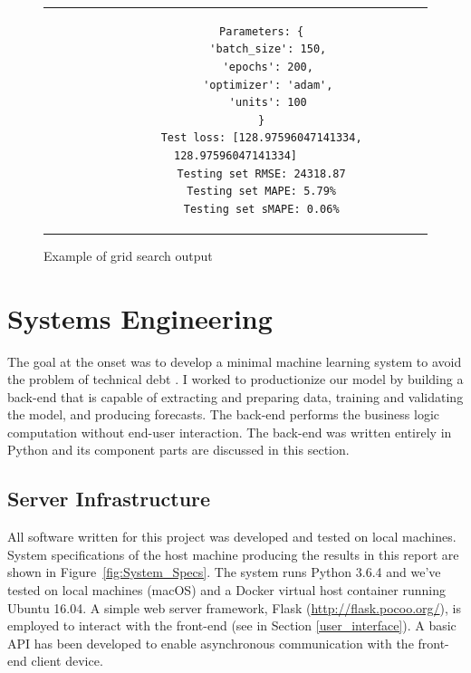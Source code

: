 \documentclass[11pt, oneside, authoryear]{report}
\begin{document}
\begin{figure}[h]
  \caption{Example of grid search output}
  \label{fig:Example_Output}
  \begin{center}
    \begin{tabular}{c}
      \begin{lstlisting}
        Parameters: {
          'batch_size': 150,
          'epochs': 200,
          'optimizer': 'adam',
          'units': 100
        }
        Test loss: [128.97596047141334, 128.97596047141334]
        Testing set RMSE: 24318.87
        Testing set MAPE: 5.79%
        Testing set sMAPE: 0.06%
      \end{lstlisting}
    \end{tabular}
  \end{center}
\end{figure}

\section{Systems Engineering}
The goal at the onset was to develop a minimal machine learning system to avoid the problem of technical debt \citep{sculley}. I worked to productionize our model by building a back-end that is capable of extracting and preparing data, training and validating the model, and producing forecasts. The back-end performs the business logic computation without end-user interaction. The back-end was written entirely in Python and its component parts are discussed in this section.

\subsection{Server Infrastructure}
All software written for this project was developed and tested on local machines. System specifications of the host machine producing the results in this report are shown in Figure~\ref{fig:System_Specs}. The system runs Python 3.6.4 and we've tested on local machines (macOS) and a Docker virtual host container running Ubuntu 16.04. A simple web server framework, Flask (\url{http://flask.pocoo.org/}), is employed to interact with the front-end (see in Section \ref{user_interface}). A basic API has been developed to enable asynchronous communication with the front-end client device.
\end{document}
